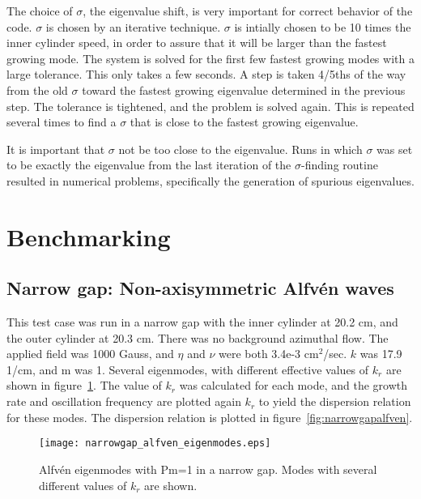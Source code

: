 \documentclass[letterpaper]{article}
\begin{document}
The choice of $\sigma$, the eigenvalue shift, is very important for
correct behavior of the code.  $\sigma$ is chosen by an iterative
technique.  $\sigma$ is intially chosen to be 10 times the inner
cylinder speed, in order to assure that it will be larger than the
fastest growing mode.  The system is solved for the first few fastest
growing modes with a large tolerance.  This only takes a few seconds.
A step is taken 4/5ths of the way from the old $\sigma$ toward the
fastest growing eigenvalue determined in the previous step.  The
tolerance is tightened, and the problem is solved again.  This is
repeated several times to find a $\sigma$ that is close to the fastest
growing eigenvalue.

It is important that $\sigma$ not be too close to the eigenvalue.
Runs in which $\sigma$ was set to be exactly the eigenvalue from the
last iteration of the $\sigma$-finding routine resulted in numerical
problems, specifically the generation of spurious eigenvalues.

\section{Benchmarking}

\subsection{Narrow gap: Non-axisymmetric Alfv\'en waves}

This test case was run in a narrow gap with the inner cylinder at 20.2
cm, and the outer cylinder at 20.3 cm.  There was no background
azimuthal flow.  The applied field was 1000 Gauss, and $\eta$ and
$\nu$ were both 3.4e-3 cm$^2$/sec.  $k$ was 17.9 1/cm, and m was 1.
Several eigenmodes, with different effective values of $k_r$ are shown
in figure~\ref{fig:narrowgapalfveneigenmodes}.  The value of $k_r$ was
calculated for each mode, and the growth rate and oscillation
frequency are plotted again $k_r$ to yield the dispersion relation for
these modes.  The dispersion relation is plotted in
figure~\ref{fig:narrowgapalfven}.

\begin{figure}
\begin{center}
\texttt{[image: narrowgap\_alfven\_eigenmodes.eps]}
\caption{Alfv\'en eigenmodes with Pm=1 in a narrow gap. Modes with
  several different values of $k_r$ are shown.}
\label{fig:narrowgapalfveneigenmodes}
\end{center}
\end{figure}
\end{document}
